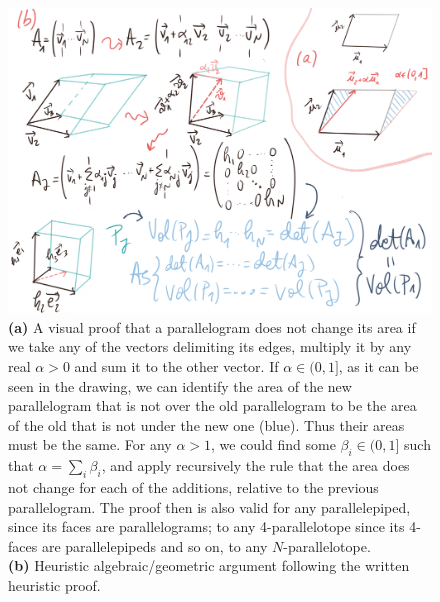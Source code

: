 \documentclass[11pt, a4paper]{article} %
\begin{document}
\begin{figure}[h!]
  \centering
    \includegraphics[width=0.65\linewidth]{10parallelepipid.png}
  \caption{ {\bf (a)} A visual proof that a parallelogram does not change its area if we take any of the vectors delimiting its edges, multiply it by any real $\alpha>0$ and sum it to the other vector. If $\alpha\in(0,1]$, as it can be seen in the drawing, we can identify the area of the new parallelogram that is not over the old parallelogram to be the area of the old that is not under the new one (blue). Thus their areas must be the same. For any $\alpha>1$, we could find some $\beta_i\in(0,1]$ such that $\alpha=\sum_i\beta_i$, and apply recursively the rule that the area does not change for each of the additions, relative to the previous parallelogram. The proof then is also valid for any parallelepiped, since its faces are parallelograms; to any 4-parallelotope since its 4-faces are parallelepipeds and so on, to any $N$-parallelotope.\\ {\bf (b)} Heuristic algebraic/geometric argument following the written heuristic proof. \vspace{-0.4cm} }
  \label{fig:volumeDet}
\end{figure}
\end{document}
